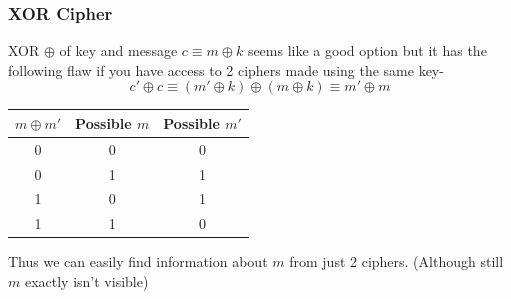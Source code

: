 			\subsubsection*{XOR Cipher}
				XOR \(\oplus\) of key and message \(c \equiv m \oplus k\) seems like a good option but it has the following flaw if you have access to 2 ciphers made using the same key-
				\[
					c' \oplus c \equiv (m' \oplus k) \oplus (m \oplus k) \equiv m' \oplus m
				\]
				\begin{center}
				\begin{tabular}{c | c  c}
					 \(m\oplus m'\)&Possible $m$ &Possible $m'$\\ 
					 \hline
					 0&0&0\\
					 0&1&1\\
					 \hline
					 1&0&1\\
					 1&1&0\\
					 \hline  
				\end{tabular}
				\end{center}
				Thus we can easily find information about \(m\) from just 2 ciphers. (Although still \(m\) exactly isn't visible)

